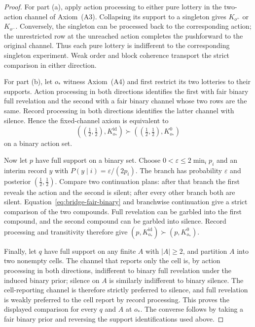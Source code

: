 \begin{proof}
For part \textup{(a)}, apply action processing to either pure lottery in the
two-action channel of Axiom~\textup{(A3)}.  Collapsing its support to
a singleton gives $K_{o^+}$ or $K_{o^-}$.  Conversely, the singleton can be
processed back to the corresponding action; the unrestricted row at the
unreached action completes the pushforward to the original channel.  Thus
each pure lottery is indifferent to the corresponding singleton experiment.
Weak order and block coherence transport the strict comparison in either
direction.

For part \textup{(b)}, let $o_\ast$ witness Axiom~\textup{(A4)} and first
restrict its two lotteries to their supports.  Action processing in both
directions identifies the first with fair binary full revelation and the
second with a fair binary channel whose two rows are the same.  Record
processing in both directions identifies the latter channel with silence.
Hence the fixed-channel axiom is equivalent to
\begin{equation}
  ((\tfrac12,\tfrac12),K^{\mathrm{id}}_{o_\ast})
  \succ
  ((\tfrac12,\tfrac12),K^0_{o_\ast})
  \label{eq:bridge-fair-binary}
\end{equation}
on a binary action set.

Now let $p$ have full support on a binary set.  Choose
$0<\varepsilon\le 2\min_i p_i$ and an interim record $y$ with
$P(y\mid i)=\varepsilon/(2p_i)$.  The branch has probability $\varepsilon$
and posterior $(\tfrac12,\tfrac12)$.  Compare two continuation plans: after that branch the
first reveals the action and the second is silent; after every other branch
both are silent.  Equation~\eqref{eq:bridge-fair-binary} and branchwise
continuation give a strict comparison of the two compounds.  Full revelation
can be garbled into the first compound, and the second compound can be
garbled into silence.  Record processing and transitivity therefore give
$(p,K^{\mathrm{id}}_{o_\ast})\succ(p,K^0_{o_\ast})$.

Finally, let $q$ have full support on any finite $A$ with $|A|\ge2$, and
partition $A$ into two nonempty cells.  The channel that reports only the cell
is, by action processing in both directions, indifferent to binary full
revelation under the induced binary prior; silence on $A$ is similarly
indifferent to binary silence.  The cell-reporting channel is therefore
strictly preferred to silence, and full revelation is weakly preferred to
the cell report by record processing.  This proves the displayed
comparison for every $q$ and $A$ at $o_\ast$.  The converse follows by taking
a fair binary prior and reversing the support identifications used above.
\end{proof}

